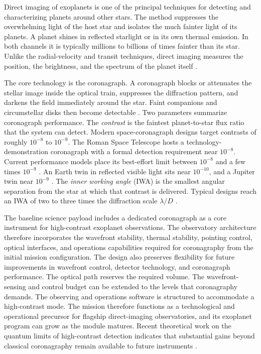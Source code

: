 Direct imaging of exoplanets is one of the principal techniques for
detecting and characterizing planets around other stars. The method
suppresses the overwhelming light of the host star and isolates the much
fainter light of its planets. A planet shines in reflected starlight or
in its own thermal emission. In both channels it is typically millions
to billions of times fainter than its star. Unlike the radial-velocity
and transit techniques, direct imaging measures the position, the
brightness, and the spectrum of the planet itself
\cite{galicher23,zurlo24}.

The core technology is the coronagraph. A coronagraph blocks or
attenuates the stellar image inside the optical train, suppresses the
diffraction pattern, and darkens the field immediately around the star.
Faint companions and circumstellar disks then become detectable
\cite{galicher23}. Two parameters summarize coronagraph performance.
The \emph{contrast} is the faintest planet-to-star flux ratio that the
system can detect. Modern space-coronagraph designs target contrasts of
roughly $10^{-8}$ to $10^{-9}$. The Roman Space Telescope hosts a
technology-demonstration coronagraph with a formal detection requirement
near $10^{-8}$. Current performance models place its best-effort limit
between $10^{-8}$ and a few times $10^{-9}$
\cite{bailey23,llopsayson25}. An Earth twin in reflected
visible light sits near $10^{-10}$, and a Jupiter twin near $10^{-9}$
\cite{traub10}. The \emph{inner working angle} (IWA) is the smallest
angular separation from the star at which that contrast is delivered.
Typical designs reach an IWA of two to three times the diffraction
scale $\lambda/D$ \cite{galicher23}.

The baseline science payload includes a dedicated coronagraph as a core instrument for high-contrast exoplanet observations. The observatory architecture therefore incorporates the wavefront stability, thermal stability, pointing control, optical interfaces, and operations capabilities required for coronagraphy from the initial mission configuration. The design also preserves flexibility for future improvements in wavefront control, detector technology, and coronagraph performance. The optical path reserves
the required volume. The wavefront-sensing and control budget can be
extended to the levels that coronagraphy demands. The observing and
operations software is structured to accommodate a high-contrast mode.
The mission therefore functions as a technological and operational
precursor for flagship direct-imaging observatories, and its exoplanet
program can grow as the module matures. Recent theoretical work on the
quantum limits of high-contrast detection indicates that substantial
gains beyond classical coronagraphy remain available to future
instruments \cite{deshler24}.

